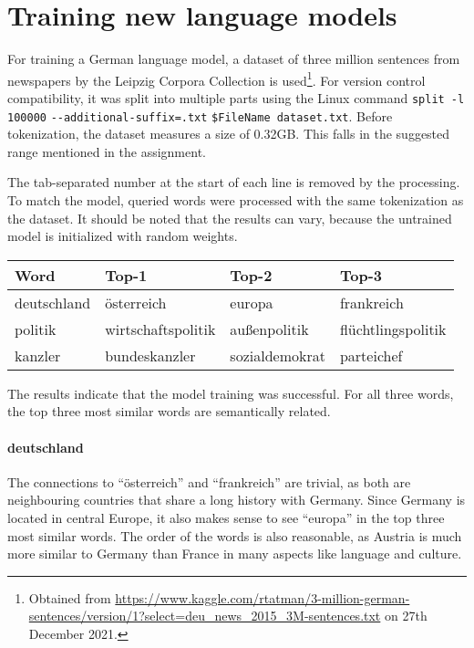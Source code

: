 \section{Training new language models}

\autocite{dataset} For training a German language model, a dataset of three million sentences from newspapers by the Leipzig Corpora Collection is used\footnote{Obtained from \url{https://www.kaggle.com/rtatman/3-million-german-sentences/version/1?select=deu_news_2015_3M-sentences.txt} on 27th December 2021.}.
For version control compatibility, it was split into multiple parts using the Linux command \verb|split -l 100000| \verb|--additional-suffix=.txt| \verb|$FileName dataset.txt|.
Before tokenization, the dataset measures a size of 0.32GB.
This falls in the suggested range mentioned in the assignment.

The tab-separated number at the start of each line is removed by the processing.
To match the model, queried words were processed with the same tokenization as the dataset.
It should be noted that the results can vary, because the untrained model is initialized with random weights.

\begin{table}[h]
\center
\begin{tabular}{|l|l|l|l|}
\hline
\textbf{Word} & \textbf{Top-1}     & \textbf{Top-2} & \textbf{Top-3}     \\ \hline
deutschland   & österreich         & europa         & frankreich         \\ \hline
politik       & wirtschaftspolitik & außenpolitik   & flüchtlingspolitik \\ \hline
kanzler       & bundeskanzler      & sozialdemokrat & parteichef         \\ \hline
\end{tabular}
\end{table}

The results indicate that the model training was successful.
For all three words, the top three most similar words are semantically related.

\paragraph{deutschland}
The connections to \enquote{österreich} and \enquote{frankreich} are trivial, as both are neighbouring countries that share a long history with Germany.
Since Germany is located in central Europe, it also makes sense to see \enquote{europa} in the top three most similar words.
The order of the words is also reasonable, as Austria is much more similar to Germany than France in many aspects like language and culture.

